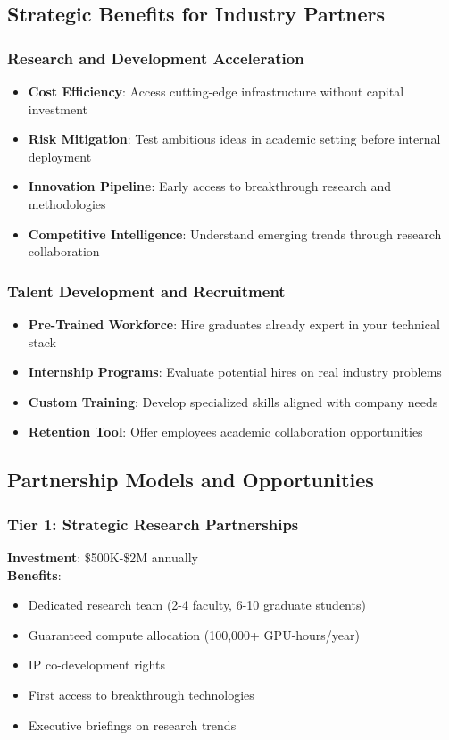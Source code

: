 \subsection{Strategic Benefits for Industry Partners}

\subsubsection{Research and Development Acceleration}
\begin{itemize}
\item \textbf{Cost Efficiency}: Access cutting-edge infrastructure without capital investment
\item \textbf{Risk Mitigation}: Test ambitious ideas in academic setting before internal deployment
\item \textbf{Innovation Pipeline}: Early access to breakthrough research and methodologies
\item \textbf{Competitive Intelligence}: Understand emerging trends through research collaboration
\end{itemize}

\subsubsection{Talent Development and Recruitment}
\begin{itemize}
\item \textbf{Pre-Trained Workforce}: Hire graduates already expert in your technical stack
\item \textbf{Internship Programs}: Evaluate potential hires on real industry problems
\item \textbf{Custom Training}: Develop specialized skills aligned with company needs
\item \textbf{Retention Tool}: Offer employees academic collaboration opportunities
\end{itemize}

\subsection{Partnership Models and Opportunities}

\subsubsection{Tier 1: Strategic Research Partnerships}
\textbf{Investment}: \$500K-\$2M annually\\
\textbf{Benefits}:
\begin{itemize}
\item Dedicated research team (2-4 faculty, 6-10 graduate students)
\item Guaranteed compute allocation (100,000+ GPU-hours/year)
\item IP co-development rights
\item First access to breakthrough technologies
\item Executive briefings on research trends
\end{itemize}

